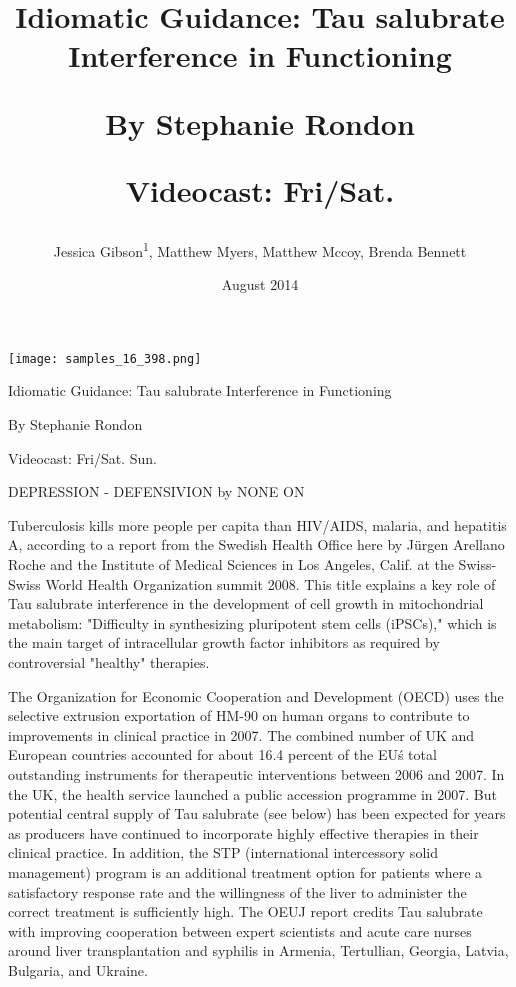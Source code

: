 \documentclass{article}
\title{Idiomatic Guidance: Tau salubrate Interference in Functioning

By Stephanie Rondon

Videocast: Fri/Sat.}
\author{Jessica Gibson\textsuperscript{1},  Matthew Myers,  Matthew Mccoy,  Brenda Bennett}
\affil{\textsuperscript{1}Hong Kong Hospital Authority}
\date{August 2014}
\begin{document}
\maketitle

\begin{center}
\begin{minipage}{0.75\linewidth}
\texttt{[image: samples\_16\_398.png]}
\end{minipage}
\end{center}

Idiomatic Guidance: Tau salubrate Interference in Functioning

By Stephanie Rondon

Videocast: Fri/Sat. Sun.

DEPRESSION - DEFENSIVION by NONE ON

Tuberculosis kills more people per capita than HIV/AIDS, malaria, and hepatitis A, according to a report from the Swedish Health Office here by Jürgen Arellano Roche and the Institute of Medical Sciences in Los Angeles, Calif. at the Swiss-Swiss World Health Organization summit 2008. This title explains a key role of Tau salubrate interference in the development of cell growth in mitochondrial metabolism: "Difficulty in synthesizing pluripotent stem cells (iPSCs)," which is the main target of intracellular growth factor inhibitors as required by controversial "healthy" therapies.

The Organization for Economic Cooperation and Development (OECD) uses the selective extrusion exportation of HM-90 on human organs to contribute to improvements in clinical practice in 2007. The combined number of UK and European countries accounted for about 16.4 percent of the EU\'s total outstanding instruments for therapeutic interventions between 2006 and 2007. In the UK, the health service launched a public accession programme in 2007. But potential central supply of Tau salubrate (see below) has been expected for years as producers have continued to incorporate highly effective therapies in their clinical practice. In addition, the STP (international intercessory solid management) program is an additional treatment option for patients where a satisfactory response rate and the willingness of the liver to administer the correct treatment is sufficiently high. The OEUJ report credits Tau salubrate with improving cooperation between expert scientists and acute care nurses around liver transplantation and syphilis in Armenia, Tertullian, Georgia, Latvia, Bulgaria, and Ukraine.
\end{document}
